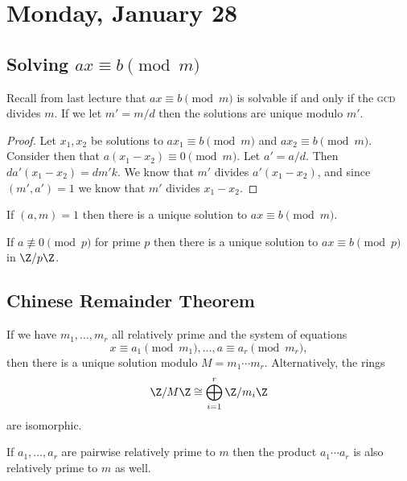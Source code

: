 
\section{Monday, January 28}

\subsection{Solving \texorpdfstring{$ax \equiv b \pmod{m}$}{ax = b (m)}}

Recall from last lecture that $ax \equiv b \pmod{m}$ is solvable if and only if the \textsc{gcd} divides $m$. If we let $m' = m/d$ then the solutions are unique modulo $m'$.

\begin{proof}
Let $x_1,x_2$ be solutions to $ax_1 \equiv b \pmod{m}$ and $ax_2 \equiv b \pmod{m}$. Consider then that $a(x_1-x_2) \equiv 0 \pmod{m}$. Let $a' = a/d$. Then $da'(x_1-x_2) = dm'k$. We know that $m'$ divides $a'(x_1-x_2)$, and since $(m',a') = 1$ we know that $m'$ divides $x_1-x_2$.
\end{proof}

\begin{corollary}
If $(a,m) = 1$ then there is a  unique solution to $ax \equiv b \pmod{m}$.
\end{corollary}

\begin{corollary}
If $a \not\equiv 0 \pmod{p}$ for prime $p$ then there is a unique solution to $ax \equiv b \pmod{p}$ in $\Z/p\Z$.
\end{corollary}

\subsection*{Chinese Remainder Theorem}

\begin{theorem}
If we have $m_1, \dotsc, m_r$ all relatively prime and the system of equations 
\[
	x \equiv a_1 \pmod{m_1}, \dotsc, a \equiv a_r \pmod{m_r},
\]
then there is a unique solution modulo $M = m_1 \cdots m_r$. Alternatively, the rings
\[ \Z/M\Z \cong \bigoplus_{i=1}^r \Z/m_i\Z \]
are isomorphic.
\end{theorem}

\begin{lemma}
If $a_1, \dotsc, a_r$ are pairwise relatively prime to $m$ then the product $a_1 \cdots a_r$ is also relatively prime to $m$ as well.
\end{lemma}

